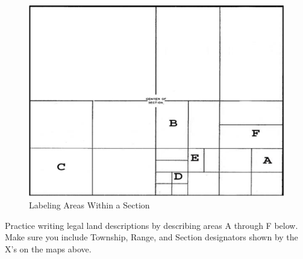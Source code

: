 \documentclass[
  letterpaper,
  twocolumn,
  portrait]{scrbook}
\begin{document}
\begin{figure}

{\centering \includegraphics{labeling-sections.png}

}

\caption{\label{fig-practice}Labeling Areas Within a Section}

\end{figure}

Practice writing legal land descriptions by describing areas A through F
below. Make sure you include Township, Range, and Section designators
shown by the X's on the maps above.

 
  \providecommand{\huxb}[2]{\arrayrulecolor[RGB]{#1}\global\arrayrulewidth=#2pt}
  \providecommand{\huxvb}[2]{\color[RGB]{#1}\vrule width #2pt}
  \providecommand{\huxtpad}[1]{\rule{0pt}{#1}}
  \providecommand{\huxbpad}[1]{\rule[-#1]{0pt}{#1}}
\end{document}
